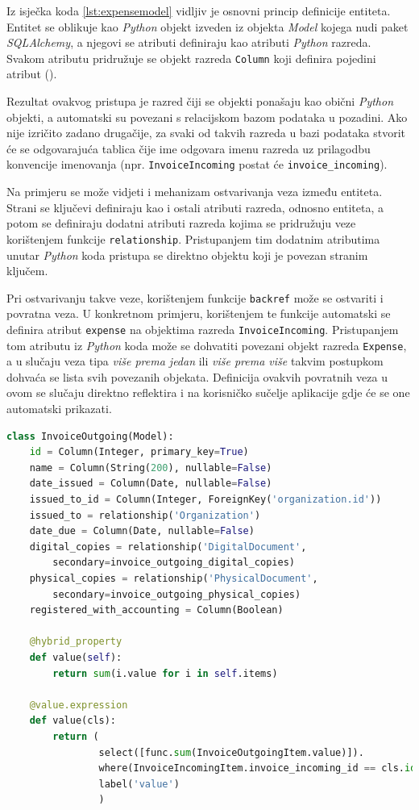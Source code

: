 \documentclass[times, utf8, diplomski]{fer}
\begin{document}
Iz isječka koda \ref{lst:expensemodel} vidljiv je osnovni princip definicije
entiteta.  Entitet se oblikuje kao \emph{Python} objekt izveden iz objekta
\emph{Model} kojega nudi paket \emph{SQLAlchemy}, a njegovi se atributi
definiraju kao atributi \emph{Python} razreda. Svakom atributu pridružuje se
objekt razreda \texttt{Column} koji definira pojedini atribut
(\cite{sqlalchemy}).

Rezultat ovakvog pristupa je razred čiji se objekti ponašaju kao obični
\emph{Python} objekti, a automatski su povezani s relacijskom bazom podataka u
pozadini. Ako nije izričito zadano drugačije, za svaki od takvih razreda u bazi
podataka stvorit će se odgovarajuća tablica čije ime odgovara imenu razreda uz
prilagodbu konvencije imenovanja (npr. \texttt{InvoiceIncoming} postat će
\texttt{invoice\_incoming}).

Na primjeru se može vidjeti i mehanizam ostvarivanja veza između entiteta.
Strani se ključevi definiraju kao i ostali atributi razreda, odnosno entiteta, a
potom se definiraju dodatni atributi razreda kojima se pridružuju veze
korištenjem funkcije \texttt{relationship}. Pristupanjem tim dodatnim atributima
unutar \emph{Python} koda pristupa se direktno objektu koji je povezan stranim
ključem.

Pri ostvarivanju takve veze, korištenjem funkcije \texttt{backref} može se
ostvariti i povratna veza. U konkretnom primjeru, korištenjem te funkcije
automatski se definira atribut \texttt{expense} na objektima razreda
\texttt{InvoiceIncoming}. Pristupanjem tom atributu iz \emph{Python} koda može
se dohvatiti povezani objekt razreda \texttt{Expense}, a u slučaju veza tipa
\emph{više prema jedan} ili \emph{više prema više} takvim postupkom dohvaća se
lista svih povezanih objekata. Definicija ovakvih povratnih veza u ovom se
slučaju direktno reflektira i na korisničko sučelje aplikacije gdje će se one
automatski prikazati.

\begin{lstlisting}[language=Python,basicstyle=\scriptsize,frame=single,caption={
kod entiteta \emph{InvoiceOutgoing}},label={lst:invoiceoutgoingmodel}]
class InvoiceOutgoing(Model):
    id = Column(Integer, primary_key=True)
    name = Column(String(200), nullable=False)
    date_issued = Column(Date, nullable=False)
    issued_to_id = Column(Integer, ForeignKey('organization.id'))
    issued_to = relationship('Organization')
    date_due = Column(Date, nullable=False)
    digital_copies = relationship('DigitalDocument',
        secondary=invoice_outgoing_digital_copies)
    physical_copies = relationship('PhysicalDocument',
        secondary=invoice_outgoing_physical_copies)
    registered_with_accounting = Column(Boolean)

    @hybrid_property
    def value(self):
        return sum(i.value for i in self.items)

    @value.expression
    def value(cls):
        return (
                select([func.sum(InvoiceOutgoingItem.value)]).
                where(InvoiceIncomingItem.invoice_incoming_id == cls.id).
                label('value')
                )
\end{lstlisting}
\end{document}
